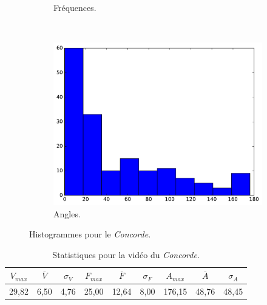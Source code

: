 \begin{appendices}
\begin{figure}[htbp]
\begin{subfigure}[t]{\subImgWclicks}
			\caption{Fréquences.}
			\label{fig:concordeA_frequency}
		\end{subfigure}
		~
		\begin{subfigure}[t]{\subImgWclicks}
			\centering
			\includegraphics[width=\textwidth]{figures/ch3/concordeA_angle}
			\caption{Angles.}
			\label{fig:concordeA_angle}
		\end{subfigure}
		\caption[Histogrammes pour le \emph{Concorde}]{Histogrammes pour le \emph{Concorde}.}
		\label{fig:histConcorde}
	\end{figure}


	\begin{table}
		\centering
		\begin{tabular}{c c c c c c c c c}
			$V_{max}$	& $\overline{V}$	& $\sigma_{V}$	& $F_{max}$	& $\overline{F}$	& $\sigma_{F}$	& $A_{max}$	& $\overline{A}$	& $\sigma_{A}$	\bigstrut[b] \\ \hline
	
			29,82		& 6,50				& 4,76			& 25,00		& 12,64				& 8,00			& 176,15	& 48,76				& 48,45			\bigstrut[t] \\
		\end{tabular}
		\caption[Statistiques pour la vidéo du \emph{Concorde}]{Statistiques pour la vidéo du \emph{Concorde}.}
		\label{tab:concordeA_stats}
	\end{table}
	
	
	

\end{appendices}

